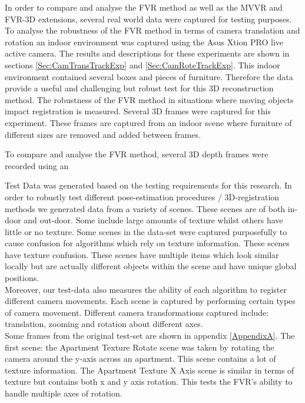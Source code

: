 
In order to compare and analyse the FVR method as well as the MVVR and FVR-3D extensions, several real world data were captured for testing purposes. To analyse the robustness of the FVR method in terms of camera translation and rotation an indoor environment was captured using the Asus Xtion PRO live active camera. The results and descriptions for these experiments are shown in sections \ref{Sec:CamTransTrackExp} and \ref{Sec:CamRoteTrackExp}. This indoor environment contained several boxes and pieces of furniture. Therefore the data provide a useful and challenging but robust test for this 3D reconstruction method. The robustness of the FVR method in situations where moving objects impact registration is measured. Several 3D frames were captured for this experiment. These frames are captured from an indoor scene where furniture of different sizes are removed and added between frames. 

To compare and analyse the FVR method, several 3D depth frames were recorded using an 

Test Data was generated based on the testing requirements for this research. In order to robustly test different pose-estimation procedures / 3D-registration methods we generated data from a variety of scenes. These scenes are of both in-door and out-door. Some include large amounts of texture whilst others have little or no texture. Some scenes in the data-set were captured purposefully to cause confusion for algorithms which rely on texture information. These scenes have texture confusion. These scenes have multiple items which look similar locally but are actually different objects within the scene and have unique global positions. \\

Moreover, our test-data also measures the ability of each algorithm to register different camera movements. Each scene is captured by performing certain types of camera movement. Different camera transformations captured include: translation, zooming and rotation about different axes. \\

Some frames from the original test-set are shown in appendix \ref{AppendixA}. The first scene: the Apartment Texture Rotate scene was taken by rotating the camera around the y-axis across an apartment. This scene contains a lot of texture information. The Apartment Texture X Axis scene is similar in terms of texture but contains both x and y axis rotation. This tests the FVR's ability to handle multiple axes of rotation. \\

